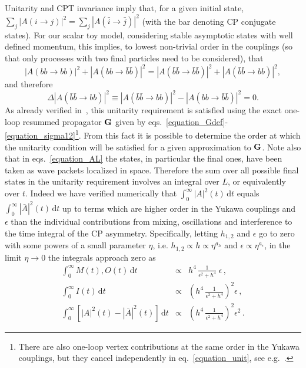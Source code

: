 \documentclass[11pt,a4paper]{article}
\providecommand{\proarrow}[0]{\rightarrow}
\providecommand{\dif}[0]{\mathrm{d}}
\providecommand{\proname}[2]{#1 \proarrow #2}
\providecommand{\abss}[1]{\left\lvert #1 \right\rvert^2}
\begin{document}
Unitarity and CPT invariance imply that, for a given initial state, $\sum_j \abss{A(\proname{i}{j})} = \sum_j \abss{A(\proname{\bar i}{\bar j})}$ (with the bar denoting CP conjugate states). For our scalar toy model, considering stable asymptotic states with well defined momentum, this implies, to lowest non-trivial order in the couplings (so that only processes with two final particles need to be considered), that 
\begin{equation*}
\abss{A(\proname{b b}{b b})} + \abss{A(\proname{b b}{\bar b \bar b})} = \abss{A(\proname{\bar b \bar b}{\bar b \bar b})} + \abss{A(\proname{\bar b \bar b}{b b})},
\end{equation*}
and therefore
\begin{equation}
\label{equation_unit}
\Delta \abss{A(\proname{\bar b \bar b}{b b})} \equiv \abss{A(\proname{\bar b \bar b}{b b})}  -  \abss{A(\proname{b b}{\bar b \bar b})} = 0 . 
\end{equation}
As already verified in~\cite{Racker20}, this unitarity requirement is satisfied using the exact one-loop resummed propagator $\bf{G}$ given by eqs.~\eqref{equation_Gdef}-\eqref{equation_sigma12}\footnote{There are also one-loop vertex contributions at the same order in the Yukawa couplings, but they cancel independently in eq.~\eqref{equation_unit}, see e.g.~\cite{roulet97}.}. From this fact it is possible to determine the order at which the unitarity condition will be satisfied for a given approximation to $\bf{G}$. 
Note also that in eqs.~\eqref{equation_AL} the states, in particular the final ones, have been taken as wave packets localized in space. Therefore the sum over all possible final states in the unitarity requirement involves an integral over $L$, or equivalently over $t$. Indeed we have verified numerically that $\int_0^\infty  \abss{A}(t) \, \dif t$ equals  $\int_0^\infty  \abss{\bar A}(t) \, \dif t$ up to terms which are higher order in the Yukawa couplings and $\epsilon$ than the individual contributions from mixing, oscillations and interference to the time integral of the CP asymmetry. Specifically, letting $h_{1,2}$ and $\epsilon$ go to zero with some powers of a small parameter $\eta$, i.e. $h_{1,2} \propto h \propto \eta^{a_h}$ and $\epsilon \propto \eta^{a_\epsilon}$, in the limit $\eta \to 0$ the integrals approach zero as
\begin{eqnarray*}
\int_0^\infty M(t), O(t) \, \dif t &\propto&  h^4 \, \frac{1}{\epsilon^2 + h^4} \; \epsilon \, ,\\
\int_0^\infty I(t) \, \dif t &\propto& \left(h^4 \, \frac{1}{\epsilon^2 + h^4}\right)^2 \epsilon \, ,\\
\int_0^\infty \left[\abss{A}(t) - \abss{\bar A}(t)\right] \, \dif t &\propto& \left(h^4 \, \frac{1}{\epsilon^2 + h^4}\right)^2 \epsilon^2\, .
\end{eqnarray*}
\end{document}
